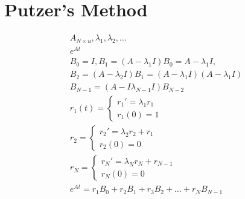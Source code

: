 \documentclass[fleqn]{report}
\newcommand{\equations} [1] {
\begin{gather*}
#1
\end{gather*}
}
\begin{document}
\section{Putzer's Method}
\equations{
A_{N \times u}, \lambda_1, \lambda_2, \ldots
\\
e^{At}
\\
B_0 = I, B_1 = (A - \lambda_1 I) B_0 = A - \lambda_1 I,
\\
B_2 =  (A - \lambda_2 I) B_1 =( A - \lambda_1 I)(A - \lambda_1 I)
\\
B_{N - 1} = (A - I \lambda_{N - 1} I) B_{N - 2}
\\
r_1(t) = 
\begin{cases}
r_1' = \lambda_1 r_1
\\
r_1(0) = 1
\end{cases}
\\
r_2 = 
\begin{cases}
r_2' = \lambda_2 r_2 + r_1
\\
r_2(0) = 0
\end{cases}
\\
r_N = 
\begin{cases}
r_N' = \lambda_N r_N + r_{N - 1}
\\
r_N(0) = 0
\end{cases}
\\
e^{At} = r_1 B_0 + r_2 B_1 + r_3 B_2 + \ldots + r_N B_{N - 1}
}
\end{document}
